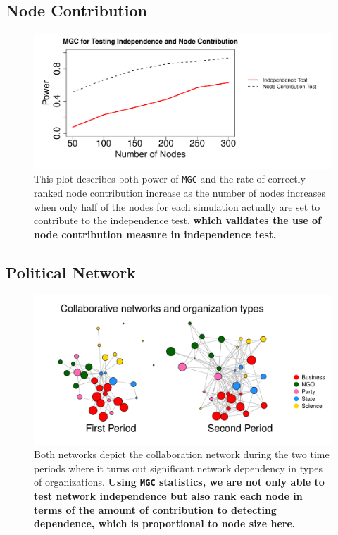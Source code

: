 \documentclass[12pt]{article}
\begin{document}
\subsection*{Node Contribution}

\begin{figure}
	\centering
		\includegraphics[width=0.6\linewidth, height = 0.3\linewidth]{../Figure/nodecontri.pdf}
	\caption{This plot describes both power of \texttt{MGC} and the rate of correctly-ranked node contribution increase as the number of nodes increases when only half of the nodes for each simulation actually are set to contribute to the independence test, \textbf{which validates the use of node contribution measure in independence test.}}
	\label{fig:contribution}
\end{figure}


\subsection*{Political Network}

\begin{figure}[H]
	\centering
		\includegraphics[width=\linewidth]{../Figure/two_politics.pdf}
	\caption{Both networks depict the collaboration network during the two time periods where it turns out significant network dependency in types of organizations. \textbf{Using \texttt{MGC} statistics, we are not only able to test network independence but also rank each node in terms of the amount of contribution to detecting dependence, which is proportional to node size here.}}
	\label{fig:politics}
\end{figure}

 
\end{document}
